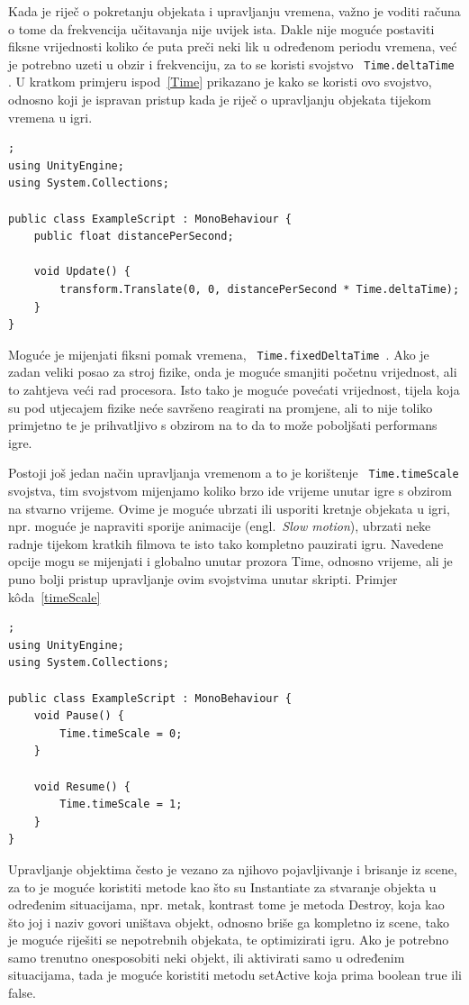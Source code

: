 Kada je riječ o pokretanju objekata i upravljanju vremena, važno je voditi računa o tome da frekvencija učitavanja nije uvijek ista. Dakle nije moguće postaviti fiksne vrijednosti koliko će puta preči neki lik u određenom periodu vremena, već je potrebno uzeti u obzir i frekvenciju, za to se koristi svojstvo \texttt{ Time.deltaTime }.
U kratkom primjeru ispod~\ref{Time} prikazano je kako se koristi ovo svojstvo, odnosno koji je ispravan pristup kada je riječ o upravljanju objekata tijekom vremena u igri.
\begin{lstlisting}[caption={Upravljanje vremenom}, label=Time];
using UnityEngine;
using System.Collections;

public class ExampleScript : MonoBehaviour {
    public float distancePerSecond;
    
    void Update() {
        transform.Translate(0, 0, distancePerSecond * Time.deltaTime);
    }
}
\end{lstlisting}
Moguće je mijenjati fiksni pomak vremena, \texttt{ Time.fixedDeltaTime }. Ako je zadan veliki posao za stroj fizike, onda je moguće smanjiti početnu vrijednost, ali to zahtjeva veći rad procesora. Isto tako je moguće povećati vrijednost, tijela koja su pod utjecajem fizike neće savršeno reagirati na promjene, ali to nije toliko primjetno te je prihvatljivo s obzirom na to da to može poboljšati performans igre.

Postoji još jedan način upravljanja vremenom a to je korištenje \texttt{ Time.timeScale }svojstva, tim svojstvom mijenjamo koliko brzo ide vrijeme unutar igre s obzirom na stvarno vrijeme. Ovime je moguće ubrzati ili usporiti kretnje objekata u igri, npr. moguće je napraviti sporije animacije (engl.~\textit{Slow motion}), ubrzati neke radnje tijekom kratkih filmova te isto tako kompletno pauzirati igru.
Navedene opcije mogu se mijenjati i globalno unutar prozora Time, odnosno vrijeme, ali je puno bolji pristup upravljanje ovim svojstvima unutar skripti. Primjer k\^oda~\ref{timeScale}
\begin{lstlisting}[caption={Upravljanje vremenom}, label=timeScale];
using UnityEngine;
using System.Collections;

public class ExampleScript : MonoBehaviour {
    void Pause() {
        Time.timeScale = 0;
    }
    
    void Resume() {
        Time.timeScale = 1;
    }
}
\end{lstlisting}
Upravljanje objektima često je vezano za njihovo pojavljivanje i brisanje iz scene, za to je moguće koristiti metode kao što su Instantiate za stvaranje objekta u određenim situacijama, npr. metak, kontrast tome je metoda Destroy, koja kao što joj i naziv govori uništava objekt, odnosno briše ga kompletno iz scene, tako je moguće riješiti se nepotrebnih objekata, te optimizirati igru. Ako je potrebno samo trenutno onesposobiti neki objekt, ili aktivirati samo u određenim situacijama, tada je moguće koristiti metodu setActive koja prima boolean true ili false.

